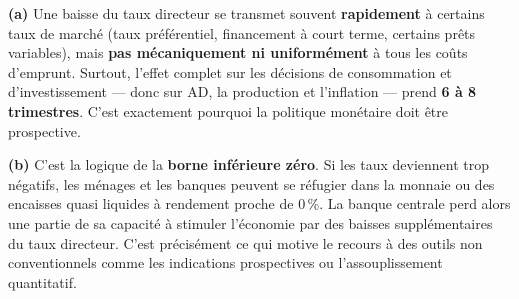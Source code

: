 \begin{reponse}
\textbf{(a)} Une baisse du taux directeur se transmet souvent \textbf{rapidement} à certains taux de marché (taux préférentiel, financement à court terme, certains prêts variables), mais \textbf{pas mécaniquement ni uniformément} à tous les coûts d'emprunt. Surtout, l'effet complet sur les décisions de consommation et d'investissement --- donc sur AD, la production et l'inflation --- prend \textbf{6 à 8 trimestres}. C'est exactement pourquoi la politique monétaire doit être prospective.
\end{reponse}


\begin{reponse}
\textbf{(b)} C'est la logique de la \textbf{borne inférieure zéro}. Si les taux deviennent trop négatifs, les ménages et les banques peuvent se réfugier dans la monnaie ou des encaisses quasi liquides à rendement proche de 0\,\%. La banque centrale perd alors une partie de sa capacité à stimuler l'économie par des baisses supplémentaires du taux directeur. C'est précisément ce qui motive le recours à des outils non conventionnels comme les indications prospectives ou l'assouplissement quantitatif.
\end{reponse}


